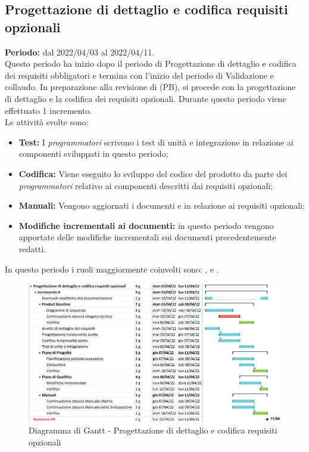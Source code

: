 \subsection{Progettazione di dettaglio e codifica requisiti opzionali} \label{subsection:pianificazione_requisiti_opzionali}
\textbf{Periodo:} dal 2022/04/03 al 2022/04/11.
\bigskip
\\Questo periodo ha inizio dopo il periodo di Progettazione di dettaglio e codifica dei requisiti obbligatori e termina con l'inizio del periodo di Validazione e collaudo.
In preparazione alla revisione di \PB{} (PB\glo{}), si procede con la progettazione di dettaglio e la codifica dei requisiti opzionali.
Durante questo periodo viene effettuato 1 incremento.
\\Le attività svolte sono:
\begin{itemize}
  \item \textbf{Test:} I \textit{programmatori} scrivono i test di unità e integrazione in relazione ai componenti sviluppati in questo periodo;
  \item \textbf{Codifica:} Viene eseguito lo sviluppo del codice del prodotto da parte dei \textit{programmatori} relativo ai componenti descritti dai requisiti opzionali;
  \item \textbf{Manuali:} Vengono aggiornati i documenti \docNameVersionMU{} e \docNameVersionMS{} in relazione ai requisiti opzionali;
  \item \textbf{Modifiche incrementali ai documenti:} in questo periodo vengono apportate delle modifiche incrementali sui documenti precedentemente redatti.
\end{itemize}
In questo periodo i ruoli maggiormente coinvolti sono: \roleDesignerLow{}, \roleProgrammerLow{} e \roleVerifierLow{}.
\bigskip
\begin{figure}[H]
  \centering
  \includegraphics[scale=0.56]{immagini/prog_requisiti_opzionali.png}
  \caption{Diagramma di Gantt - Progettazione di dettaglio e codifica requisiti opzionali}
\end{figure}
\pagebreak

